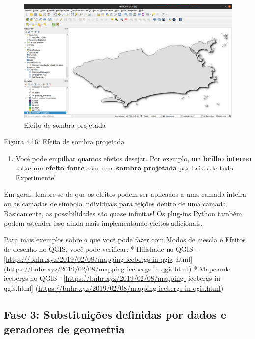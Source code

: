 \documentclass[
]{book}
\providecommand{\tightlist}{%
  \setlength{\itemsep}{0pt}\setlength{\parskip}{0pt}}
\begin{document}
\begin{figure}
\centering
\includegraphics{media/modulo4/drop-shadow-result.png}
\caption{Efeito de sombra projetada}
\end{figure}

Figura 4.16: Efeito de sombra projetada

\begin{enumerate}
\def\labelenumi{\arabic{enumi}.}
\setcounter{enumi}{7}
\tightlist
\item
  Você pode empilhar quantos efeitos desejar. Por exemplo, um \textbf{brilho interno} sobre um \textbf{efeito fonte} com uma \textbf{sombra projetada} por baixo de tudo. Experimente!
\end{enumerate}

Em geral, lembre-se de que os efeitos podem ser aplicados a uma camada inteira ou às camadas de símbolo individuais para feições dentro de uma camada. Basicamente, as possibilidades são quase infinitas! Os plug-ins Python também podem estender isso ainda mais implementando efeitos adicionais.

Para mais exemplos sobre o que você pode fazer com Modos de mescla e Efeitos de desenho no QGIS, você pode verificar:
* Hillshade no QGIS - {[}\url{https://bnhr.xyz/2019/02/08/mapping-icebergs-in-qgis}. html{]} (\url{https://bnhr.xyz/2019/02/08/mapping-icebergs-in-qgis.html})
* Mapeando icebergs no QGIS - {[}\url{https://bnhr.xyz/2019/02/08/mapping-} icebergs-in-qgis.html{]} (\url{https://bnhr.xyz/2019/02/08/mapping-icebergs-in-qgis.html})

\hypertarget{fase-3-substituiuxe7uxf5es-definidas-por-dados-e-geradores-de-geometria}{%
\subsection{Fase 3: Substituições definidas por dados e geradores de geometria}\label{fase-3-substituiuxe7uxf5es-definidas-por-dados-e-geradores-de-geometria}}
\end{document}

